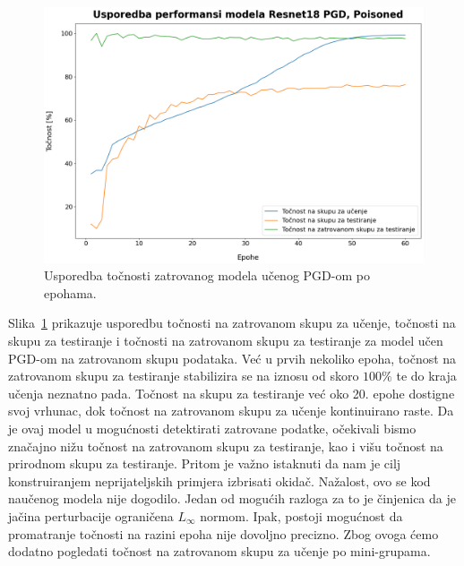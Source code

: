 \documentclass[times, utf8, zavrsni, numeric]{fer}
\begin{document}
\begin{figure}[htb]
    \centering
    \includegraphics[scale=0.41]{../stats/resnet18_poisoned_pgd_epochs_60_lr_0.1/stats_comparison.png}
    \caption{Usporedba točnosti zatrovanog modela učenog PGD-om po epohama.}
    \label{fig:pgd_poisoned_acc}
\end{figure}

\pagebreak

Slika~\ref{fig:pgd_poisoned_acc} prikazuje usporedbu točnosti na zatrovanom skupu za učenje, točnosti na skupu za testiranje i točnosti na zatrovanom skupu za testiranje 
za model učen PGD-om na zatrovanom skupu podataka. Već u prvih nekoliko epoha, točnost na zatrovanom skupu za testiranje stabilizira se na iznosu od skoro $100\%$ te do kraja učenja neznatno pada.
Točnost na skupu za testiranje već oko 20. epohe dostigne svoj vrhunac, dok točnost na zatrovanom skupu za učenje kontinuirano raste. Da je ovaj model u mogućnosti detektirati zatrovane podatke,
očekivali bismo značajno nižu točnost na zatrovanom skupu za testiranje, kao i višu točnost na prirodnom skupu za testiranje. 
Pritom je važno istaknuti da nam je cilj konstruiranjem neprijateljskih primjera izbrisati okidač. Nažalost, ovo se kod naučenog modela nije dogodilo.
Jedan od mogućih razloga za to je činjenica da je jačina perturbacije ograničena $L_{\infty}$ normom.
Ipak, postoji mogućnost da promatranje točnosti na razini epoha nije dovoljno precizno. Zbog ovoga ćemo dodatno pogledati točnost na zatrovanom skupu za učenje po mini-grupama.
\end{document}
